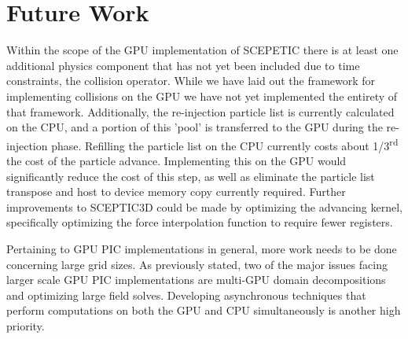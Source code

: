 \section{Future Work}
Within the scope of the GPU implementation of SCEPETIC there is at least one additional physics component that has not yet been included due to time constraints, the collision operator. While we have laid out the framework for implementing collisions on the GPU we have not yet implemented the entirety of that framework. Additionally, the re-injection particle list is currently calculated on the CPU, and a portion of this 'pool' is transferred to the GPU during the re-injection phase. Refilling the particle list on the CPU currently costs about 1/3\textsuperscript{rd} the cost of the particle advance. Implementing this on the GPU would significantly reduce the cost of this step, as well as eliminate the particle list transpose and host to device memory copy currently required. Further improvements to SCEPTIC3D could be made by optimizing the advancing kernel, specifically optimizing the force interpolation function to require fewer registers. 

Pertaining to GPU PIC implementations in general, more work needs to be done concerning large grid sizes. As previously stated, two of the major issues facing larger scale GPU PIC implementations are multi-GPU domain decompositions and optimizing large field solves. Developing asynchronous techniques that perform computations on both the GPU and CPU simultaneously is another high priority. 



